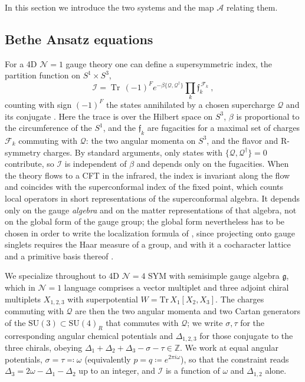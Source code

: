 \documentclass[aps, prx, nofootinbib, twocolumn,amsfonts,amsmath,amssymb,mathtools,superscriptaddress,preprintnumbers,floatfix,reprint]{revtex4-2}
\newcommand{\alg}{\mathfrak{g}}
\DeclareMathOperator{\tr}{Tr}
\begin{document}
In this section we introduce the two systems and the map $\mathcal{A}$ relating them.

\subsection{Bethe Ansatz equations}
\label{sub:BAE}

For a 4D $\mathcal{N}=1$ gauge theory one can define a supersymmetric index,
the partition function on $S^1\times S^3$,
\begin{equation}\label{eq:index_def}
  \mathcal{I}=\tr\,(-1)^F e^{-\beta\{\mathcal{Q},\mathcal{Q}^\dagger\}}
  \prod_k \mathfrak{f}_k^{\,\mathcal{F}_k}\ ,
\end{equation}
counting with sign $(-1)^F$ the states annihilated by a chosen supercharge
$\mathcal{Q}$ and its conjugate \cite{Kinney:2005ej,Romelsberger:2005eg}. Here
the trace is over the Hilbert space on $S^3$, $\beta$ is proportional to the
circumference of the $S^1$, and the $\mathfrak{f}_k$ are fugacities for a
maximal set of charges $\mathcal{F}_k$ commuting with $\mathcal{Q}$: the two
angular momenta on $S^3$, and the flavor and R-symmetry charges. By standard arguments, only states
with $\{\mathcal{Q},\mathcal{Q}^\dagger\}=0$ contribute, so $\mathcal{I}$ is
independent of $\beta$ and depends only on the fugacities. When the theory flows to a CFT in the infrared, the index is invariant along
the flow and coincides with the superconformal index of the fixed point, which
counts local operators in short representations of the superconformal algebra.
It depends only on the gauge \emph{algebra} and on the matter representations
of that algebra, not on the global form of the gauge group; the global form
nevertheless has to be chosen in order to write the localization formula of \cite{Romelsberger:2005eg,Dolan:2008qi}, since
projecting onto gauge singlets requires the Haar measure of a group, and with
it a cocharacter lattice and a primitive basis thereof \cite{B2paper}.

We specialize throughout to 4D $\mathcal{N}=4$ SYM with semisimple gauge algebra
$\alg$, which in $\mathcal{N}=1$ language comprises a vector multiplet and three
adjoint chiral multiplets $X_{1,2,3}$ with superpotential
$W=\mathrm{Tr}\,X_1[X_2,X_3]$. The charges commuting with $\mathcal{Q}$ are then the two angular momenta and
two Cartan generators of the $\mathrm{SU}(3)\subset\mathrm{SU}(4)_R$ that
commutes with $\mathcal{Q}$; we write $\sigma,\tau$ for the corresponding
angular chemical potentials and $\Delta_{1,2,3}$ for those conjugate to the
three chirals, obeying $\Delta_1+\Delta_2+\Delta_3-\sigma-\tau\in\mathbb{Z}$.
We work at equal angular potentials, $\sigma=\tau\eqqcolon\omega$ (equivalently
$p=q\coloneqq e^{2\pi i \omega}$), so that the constraint reads $\Delta_3=2\omega-\Delta_1-\Delta_2$ up to
an integer, and $\mathcal{I}$ is a function of $\omega$ and $\Delta_{1,2}$
alone.
\end{document}
